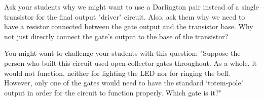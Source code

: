 
Ask your students why we might want to use a Darlington pair instead of a single transistor for the final output "driver" circuit.  Also, ask them why we need to have a resistor connected between the gate output and the transistor base.  Why not just directly connect the gate's output to the base of the transistor?

You might want to challenge your students with this question: "Suppose the person who built this circuit used open-collector gates throughout.  As a whole, it would not function, neither for lighting the LED nor for ringing the bell.  However, only one of the gates would need to have the standard `totem-pole' output in order for the circuit to function properly.  Which gate is it?"




